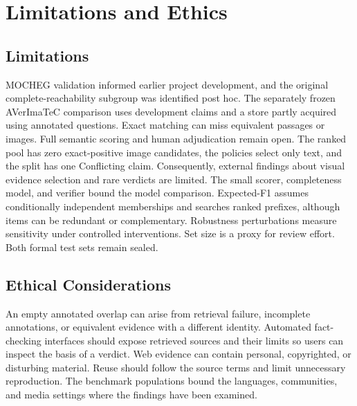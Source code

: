 \section{Limitations and Ethics}
\label{sec:limitations}

\subsection{Limitations}

MOCHEG validation informed earlier project development, and the original complete-reachability subgroup was identified post hoc. The separately frozen AVerImaTeC comparison uses development claims and a store partly acquired using annotated questions. Exact matching can miss equivalent passages or images. Full semantic scoring and human adjudication remain open. The ranked pool has zero exact-positive image candidates, the policies select only text, and the split has one Conflicting claim. Consequently, external findings about visual evidence selection and rare verdicts are limited. The small scorer, completeness model, and verifier bound the model comparison. Expected-F1 assumes conditionally independent memberships and searches ranked prefixes, although items can be redundant or complementary. Robustness perturbations measure sensitivity under controlled interventions. Set size is a proxy for review effort. Both formal test sets remain sealed.

\subsection{Ethical Considerations}

An empty annotated overlap can arise from retrieval failure, incomplete annotations, or equivalent evidence with a different identity. Automated fact-checking interfaces should expose retrieved sources and their limits so users can inspect the basis of a verdict. Web evidence can contain personal, copyrighted, or disturbing material. Reuse should follow the source terms and limit unnecessary reproduction. The benchmark populations bound the languages, communities, and media settings where the findings have been examined.
